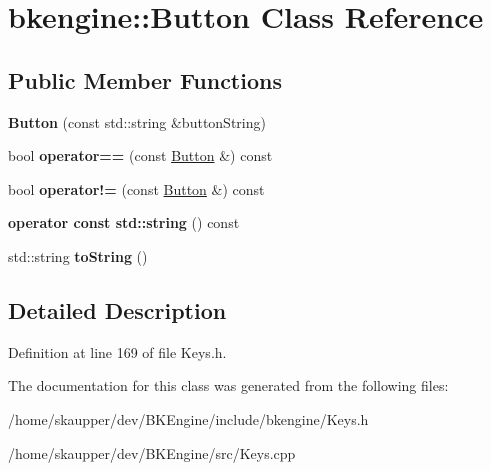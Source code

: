 \hypertarget{classbkengine_1_1Button}{}\section{bkengine\+:\+:Button Class Reference}
\label{classbkengine_1_1Button}
\subsection*{Public Member Functions}
\begin{DoxyCompactItemize}
\item 
\mbox{\label{classbkengine_1_1Button_a07d94c1cf55fc36edd123b02217af399}} 
{\bfseries Button} (const std\+::string \&button\+String)
\item 
\mbox{\label{classbkengine_1_1Button_ac7c2bc4c54d0cc9fefd082c9d6c575dd}} 
bool {\bfseries operator==} (const \hyperlink{classbkengine_1_1Button}{Button} \&) const
\item 
\mbox{\label{classbkengine_1_1Button_a9436026b1ecd0705629ef795ce43e345}} 
bool {\bfseries operator!=} (const \hyperlink{classbkengine_1_1Button}{Button} \&) const
\item 
\mbox{\label{classbkengine_1_1Button_a77b7b58ddc9879eb051d0e3de651a2bb}} 
{\bfseries operator const std\+::string} () const
\item 
\mbox{\label{classbkengine_1_1Button_af83d858e8e6f0f7fe868a65ac7a08fa6}} 
std\+::string {\bfseries to\+String} ()
\end{DoxyCompactItemize}


\subsection{Detailed Description}


Definition at line 169 of file Keys.\+h.



The documentation for this class was generated from the following files\+:\begin{DoxyCompactItemize}
\item 
/home/skaupper/dev/\+B\+K\+Engine/include/bkengine/Keys.\+h\item 
/home/skaupper/dev/\+B\+K\+Engine/src/Keys.\+cpp\end{DoxyCompactItemize}
